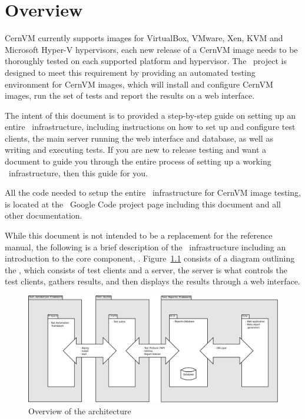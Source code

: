 \chapter{Overview}
\label{sct:overview}

CernVM currently supports images for VirtualBox, VMware, Xen, KVM and Microsoft Hyper-V hypervisors, each new release of a CernVM image needs to be 
thoroughly tested on each supported platform and hypervisor. The \cernvmreleasetesting\ project is designed to meet this requirement by providing an 
automated testing environment for CernVM images, which will install and configure CernVM images, run the set of tests and report the results on a web
interface.

The intent of this document is to provided a step-by-step guide on setting up an entire \cernvmreleasetesting\ infrastructure, including instructions
on how to set up and configure test clients, the main server running the web interface and database, as well as writing and executing tests. If you are
new to release testing and want a document to guide you through the entire process of setting up a working \cernvmreleasetesting\ infrastructure,
then this guide for you.

All the code needed to setup the entire \releasetesting\ infrastructure for CernVM image testing, is located at the \cernvmreleasetesting\ Google Code project
page\cite{GCreleasetesting} including this document and all other documentation. 

While this document is not intended to be a replacement for the reference manual, the following is a brief description of the \releasetesting\ infrastructure 
including an introduction to the core component, \amdtapper\cite{tapper}. Figure~\ref{fig:architecture} consists of a diagram outlining the
, which consists of test clients and a server, the server is what controls the test clients, gathers 
results, and then displays the results through a web interface.\newline

\begin{figure}[!hbp]
	\begin{center}
		\includegraphics[scale=0.25]{img/tapper_architecture_overview.png}
	\end{center}
	\caption{Overview of the \tapper architecture}
	\label{fig:architecture}
\end{figure}

